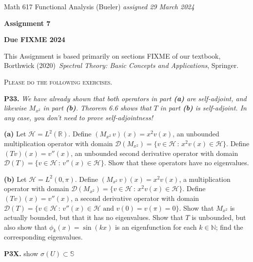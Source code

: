 \documentclass[12pt]{amsart}
\newcommand{\cD}{\mathcal{D}}
\newcommand{\cH}{\mathcal{H}}
\newcommand{\NN}{\mathbb{N}}
\newcommand{\RR}{\mathbb{R}}
\newcommand{\prob}[1]{\bigskip\noindent\textbf{#1.}\quad }
\newcommand{\epart}[1]{\medskip\noindent\textbf{(#1)}\quad }
\begin{document}
\scriptsize \noindent Math 617 Functional Analysis (Bueler) \hfill \emph{assigned 29 March 2024}
\normalsize\medskip

\Large\centerline{\textbf{Assignment 7}}
\large
\medskip

\centerline{\textbf{Due FIXME 2024}}
\medskip
\normalsize

\thispagestyle{empty}

\bigskip
\noindent This Assignment is based primarily on sections FIXME of our textbook, Borthwick (2020)~\emph{Spectral Theory: Basic Concepts and Applications}, Springer.

\medskip
\noindent \textsc{Please do the following exercises.}
\smallskip

\renewcommand{\SS}{\mathbb{S}}

\prob{P33}  \emph{We have already shown that both operators in part \emph{\textbf{(a)}} are self-adjoint, and likewise $M_{x^2}$ in part \emph{\textbf{(b)}}.  Theorem 6.6 shows that $T$ in part \emph{\textbf{(b)}} is self-adjoint.  In any case, you don't need to prove self-adjointness!}

\epart{a}  Let $\cH = L^2(\RR)$.  Define $\left(M_{x^2}\, v\right)(x) = x^2 v(x)$, an unbounded multiplication operator with domain $\cD(M_{x^2}) = \{v\in\cH\,:\,x^2 v(x) \in \cH\}$.  Define $(Tv)(x) = v''(x)$, an unbounded second derivative operator with domain $\cD(T) = \{v\in\cH\,:\,v''(x) \in \cH\}$.  Show that these operators have no eigenvalues.

\epart{b}  Let $\cH = L^2(0,\pi)$.  Define $\left(M_{x^2}\, v\right)(x) = x^2 v(x)$, a multiplication operator with domain $\cD(M_{x^2}) = \{v\in\cH\,:\,x^2 v(x) \in \cH\}$.  Define $(Tv)(x) = v''(x)$, a second derivative operator with domain $\cD(T) = \{v\in\cH\,:\,v''(x) \in \cH \text{ and } v(0)=v(\pi)=0\}$.  Show that $M_{x^2}$ is actually bounded, but that it has no eigenvalues.  Show that $T$ is unbounded, but also show that $\phi_k(x) = \sin(kx)$ is an eigenfunction for each $k\in\NN$; find the corresponding eigenvalues.

\prob{P3X}  show $\sigma(U) \subset \SS$
\end{document}
